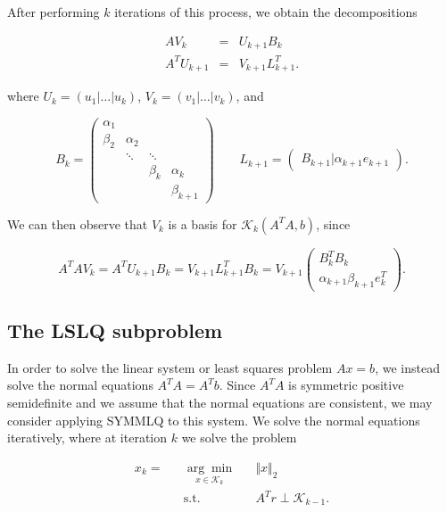 \documentclass[11pt]{article}
\newcommand{\KK}{\mathcal{K}_k}
\begin{document}
After performing $k$ iterations of this process, we obtain the decompositions

\begin{eqnarray}
\label{GKdcmp1}
A V_k &=& U_{k+1} B_k \\
\label{GKdcmp2}
A^T U_{k+1} &=& V_{k+1} L^T_{k+1}.
\end{eqnarray}

where $U_k = \left( u_1  | \dots | u_k \right)$, $V_k = \left( v_1 | \dots | v_k \right)$, and

\begin{equation*}
B_k = \begin{pmatrix}
\alpha_1 & & & \\
\beta_2 & \alpha_2 & & \\
 & \ddots & \ddots & \\
 & & \beta_k & \alpha_k \\
 & & & \beta_{k+1} 
\end{pmatrix} \qquad L_{k+1} = \begin{pmatrix}
B_{k+1} | \alpha_{k+1} e_{k+1}
\end{pmatrix}.
\end{equation*}

We can then observe that $V_k$ is a basis for $\KK (A^T A, b)$, since

$$ A^T A V_k = A^T U_{k+1} B_k = V_{k+1} L^T_{k+1} B_k = V_{k+1} \begin{pmatrix}
B^T_k B_k \\
\alpha_{k+1} \beta_{k+1} e^T_k
\end{pmatrix}.
$$

\subsection{The LSLQ subproblem}
In order to solve the linear system or least squares problem $Ax = b$, we instead solve the normal equations $A^T A = A^T b$. Since $A^T A$ is symmetric positive semidefinite and we assume that the normal equations are consistent, we may consider applying SYMMLQ to this system.
We solve the normal equations iteratively, where at iteration $k$ we solve the problem

\begin{equation}
\label{lslqsubproblem}
\begin{aligned}
x_k =&& \underset{x \in \KK}{\arg\min} && \Vert x \Vert_2 \\
&& \text{s.t.} && A^T r \perp \mathcal{K}_{k-1}.
\end{aligned}
\end{equation}
\end{document}
